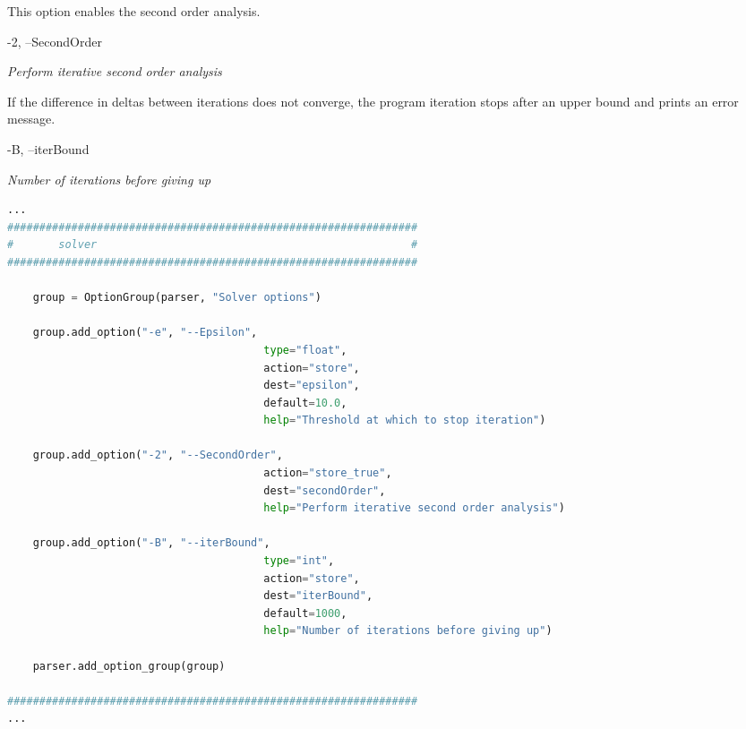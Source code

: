 This option enables the second order analysis.

\vspace{2em}
\begin{addmargin}[2em]{1em}
-2, --SecondOrder

\textit{Perform iterative second order analysis}
\end{addmargin}
\vspace{2em}

If the difference in deltas between iterations does not converge, the program iteration stops after an upper bound and prints an error message.

\vspace{2em}
\begin{addmargin}[2em]{1em}
-B, --iterBound

\textit{Number of iterations before giving up}
\end{addmargin}
\vspace{2em}

\begin{inconsolata}
\begin{minipage}{\linewidth}
\begin{lstlisting}[language=python]
...
################################################################
#       solver                                                 #
################################################################

    group = OptionGroup(parser, "Solver options")

    group.add_option("-e", "--Epsilon",
                                        type="float",
                                        action="store",
                                        dest="epsilon",
                                        default=10.0,
                                        help="Threshold at which to stop iteration")

    group.add_option("-2", "--SecondOrder",
                                        action="store_true",
                                        dest="secondOrder",
                                        help="Perform iterative second order analysis")

    group.add_option("-B", "--iterBound",
                                        type="int",
                                        action="store",
                                        dest="iterBound",
                                        default=1000,
                                        help="Number of iterations before giving up")

    parser.add_option_group(group)

################################################################
...
\end{lstlisting}
\end{minipage}
\end{inconsolata}


